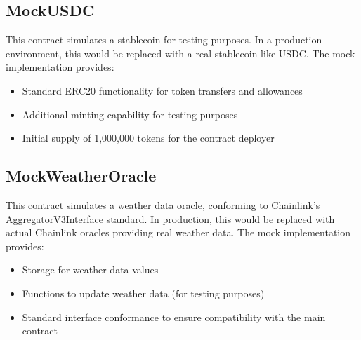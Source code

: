 \documentclass[11pt,a4paper]{article}
\begin{document}
	\subsection{MockUSDC}\label{subsec:analysis-mock-usdc}
	This contract simulates a stablecoin for testing purposes.
    In a production environment, this would be replaced with a real stablecoin like USDC. The mock implementation provides:

	\begin{itemize}
	    \item Standard ERC20 functionality for token transfers and allowances
	    \item Additional minting capability for testing purposes
	    \item Initial supply of 1,000,000 tokens for the contract deployer
	\end{itemize}

	\subsection{MockWeatherOracle}\label{subsec:analysis-mock-weather-oracle}
	This contract simulates a weather data oracle, conforming to Chainlink's AggregatorV3Interface standard.
    In production, this would be replaced with actual Chainlink oracles providing real weather data.
    The mock implementation provides:

	\begin{itemize}
	    \item Storage for weather data values
	    \item Functions to update weather data (for testing purposes)
	    \item Standard interface conformance to ensure compatibility with the main contract
	\end{itemize}
\end{document}
